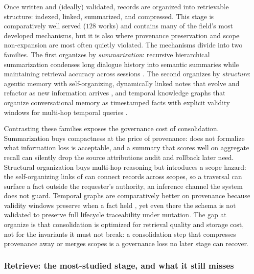 Once written and (ideally) validated, records are organized into retrievable structure: indexed, linked, summarized, and compressed. This stage is comparatively well served ($128$ works) and contains many of the field's most developed mechanisms, but it is also where provenance preservation and scope non-expansion are most often quietly violated. The mechanisms divide into two families. The first organizes by \emph{summarization}: recursive hierarchical summarization condenses long dialogue history into semantic summaries while maintaining retrieval accuracy across sessions \citep{wang2023recursivesummary}. The second organizes by \emph{structure}: agentic memory with self-organizing, dynamically linked notes that evolve and refactor as new information arrives \citep{xu2025amemagenticmemoryllm}, and temporal knowledge graphs that organize conversational memory as timestamped facts with explicit validity windows for multi-hop temporal queries \citep{rasmussen2025zep}.

Contrasting these families exposes the governance cost of consolidation. Summarization buys compactness at the price of provenance: \citet{wang2023recursivesummary} does not formalize what information loss is acceptable, and a summary that scores well on aggregate recall can silently drop the source attributions audit and rollback later need. Structural organization buys multi-hop reasoning but introduces a scope hazard: the self-organizing links of \citet{xu2025amemagenticmemoryllm} can connect records across scopes, so a traversal can surface a fact outside the requester's authority, an inference channel the system does not guard. Temporal graphs are comparatively better on provenance because validity windows preserve when a fact held \citep{rasmussen2025zep}, yet even there the schema is not validated to preserve full lifecycle traceability under mutation. The gap at organize is that consolidation is optimized for retrieval quality and storage cost, not for the invariants it must not break: a consolidation step that compresses provenance away or merges scopes is a governance loss no later stage can recover.

\subsubsection{Retrieve: the most-studied stage, and what it still misses}

